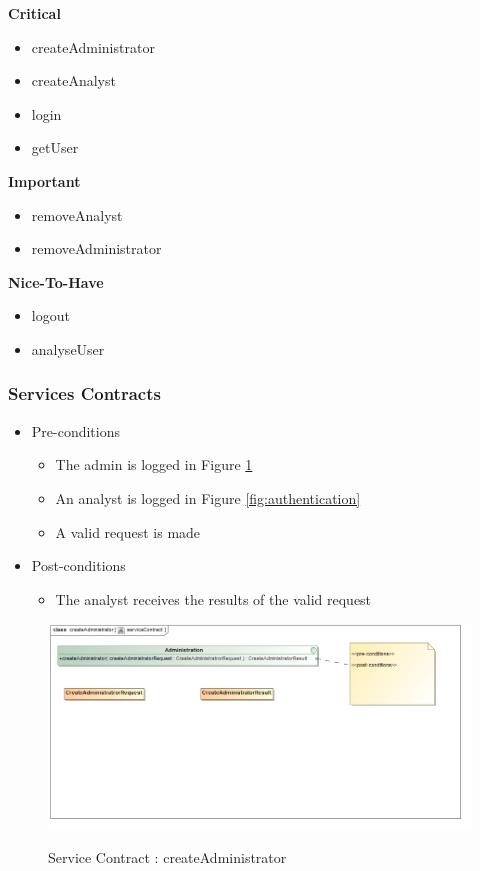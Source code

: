 \documentclass{article}
\begin{document}
		\begin{flushleft}
			\textbf{Critical}
				\begin{itemize}
					\item createAdministrator
					\item createAnalyst
					\item login
					\item getUser
				\end{itemize}
			\textbf{Important}
				\begin{itemize}
					\item removeAnalyst
					\item removeAdministrator
				\end{itemize}

			\textbf{Nice-To-Have}
				\begin{itemize}
					\item logout
					\item analyseUser
				\end{itemize}
		\end{flushleft}

		\subsubsection{Services Contracts}
		\begin{itemize}
			\item Pre-conditions
				\begin{itemize}
					\item The admin is logged in Figure \ref{fig:createAdmin}
					\item An analyst is logged in Figure \ref{fig:authentication}
					\item A valid request is made
				\end{itemize}
			\item Post-conditions
				\begin{itemize}
					\item The analyst receives the results of the valid request
				\end{itemize}
		\end{itemize}
		\begin{figure}[H]
		\includegraphics[width=\textwidth]{images/class__createAdministrator__serviceContract.jpg}  \\
		\caption{Service Contract : createAdministrator}
		\label{fig:createAdmin}
		\end{figure}
		
\end{document}
